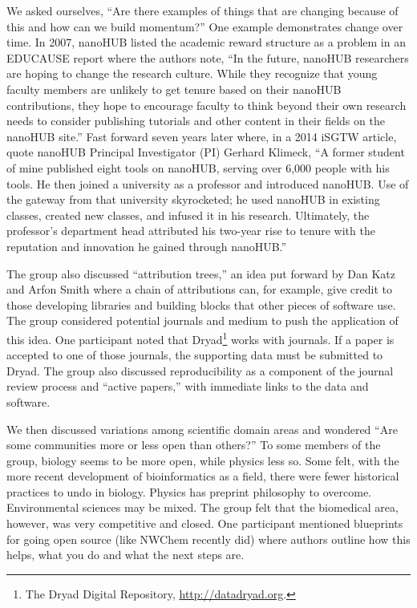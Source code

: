 \documentclass[11pt, oneside]{amsart}
\begin{document}
We asked ourselves, ``Are there examples of things that are changing
because of this and how can we build momentum?'' One example demonstrates change
over time. In 2007, nanoHUB listed the academic reward structure as a problem in
an EDUCAUSE report where the authors note, ``In the future, nanoHUB researchers
are hoping to change the research culture. While they recognize that young
faculty members are unlikely to get tenure based on their nanoHUB contributions,
they hope to encourage faculty to think beyond their own research needs to
consider publishing tutorials and other content in their fields on the
nanoHUB site.'' Fast forward seven years later where, in a 2014 iSGTW article,
quote nanoHUB Principal Investigator (PI) Gerhard Klimeck, ``A former student of
mine published eight tools on nanoHUB, serving over 6,000 people with his tools.
He then joined a university as a professor and introduced nanoHUB. Use of the
gateway from that university skyrocketed; he used nanoHUB in existing classes,
created new classes, and infused it in his research. Ultimately, the professor's
department head attributed his two-year rise to tenure with the reputation and
innovation he gained through nanoHUB.''

The group also discussed ``attribution trees,'' an idea put forward by Dan Katz
and Arfon Smith where a chain of attributions can, for example, give credit to
those developing libraries and building blocks that other pieces of software
use. The group considered potential journals and medium to push the application
of this idea. One participant noted that Dryad\footnote{The Dryad Digital
Repository, \url{http://datadryad.org}.} works with journals. If a paper is
accepted to one of those journals, the supporting data must be submitted to Dryad.
The group also discussed reproducibility as
a component of the journal review process and ``active papers,'' with immediate
links to the data and software.

We then discussed variations among scientific domain areas and wondered ``Are
some communities more or less open than others?'' To some members of the group,
biology seems to be more open, while physics less so. Some felt, with the more recent
development of bioinformatics as a field, there were fewer historical practices
to undo in biology. Physics has preprint philosophy to overcome. Environmental sciences
may be mixed. The group felt that the biomedical area, however, was very competitive
and closed. One participant mentioned blueprints for going open source (like
NWChem recently did) where authors outline how this helps, what you do and what
the next steps are.
\end{document}
